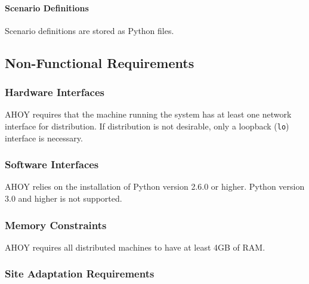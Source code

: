 \documentclass[titlepage]{article}
\begin{document}
    \paragraph{Scenario Definitions} Scenario definitions are stored as Python files.


\subsection{Non-Functional Requirements} 

\subsubsection{Hardware Interfaces%
  \label{hardware-interfaces}%
}

AHOY requires that the machine running the system has at least one network interface for distribution.  If distribution is not desirable, only a loopback (\texttt{lo}) interface is necessary.

\subsubsection{Software Interfaces%
  \label{software-interfaces}%
}

AHOY relies on the installation of Python version 2.6.0 or higher.  Python version 3.0 and higher is not supported.


\subsubsection{Memory Constraints%
  \label{memory-constraints}%
}

AHOY requires all distributed machines to have at least 4GB of RAM.


\subsubsection{Site Adaptation Requirements%
  \label{site-adaptation-requirements}%
}
\end{document}

